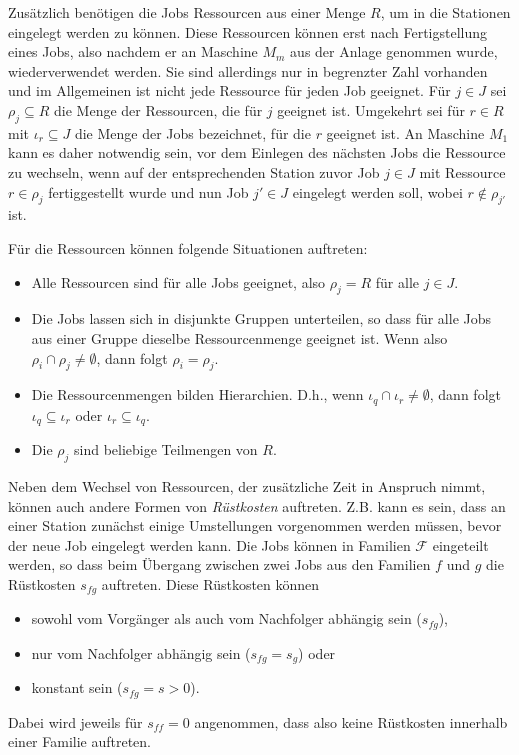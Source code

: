 \documentclass{scrreprt}
\begin{document}
Zusätzlich benötigen die Jobs Ressourcen aus einer Menge $R$, um in die Stationen eingelegt werden zu können. Diese Ressourcen können erst nach
Fertigstellung eines Jobs, also nachdem er an Maschine $M_m$ aus der Anlage genommen wurde, wiederverwendet werden.
Sie sind allerdings nur in begrenzter Zahl vorhanden und im Allgemeinen ist nicht jede Ressource für jeden Job geeignet.
Für $j\in J$ sei $\rho_j\subseteq R$ die Menge der Ressourcen, die für $j$ geeignet ist.
Umgekehrt sei für $r\in R$ mit $\iota_r\subseteq J$ die Menge der Jobs bezeichnet, für die $r$ geeignet ist.
An Maschine $M_1$ kann es daher notwendig sein, vor dem Einlegen des nächsten Jobs die Ressource zu wechseln, 
wenn auf der entsprechenden Station zuvor Job $j\in J$ mit Ressource $r\in\rho_j$ fertiggestellt wurde 
und nun Job $j'\in J$ eingelegt werden soll, wobei $r\not\in\rho_{j'}$ ist.

Für die Ressourcen können folgende Situationen auftreten:
\begin{itemize}
    \item Alle Ressourcen sind für alle Jobs geeignet, also $\rho_j=R$ für alle $j\in J$.
    \item Die Jobs lassen sich in disjunkte Gruppen unterteilen, so dass für alle Jobs aus einer Gruppe dieselbe Ressourcenmenge geeignet ist.
        Wenn also $\rho_i \cap \rho_j \neq \emptyset$, dann folgt $\rho_i=\rho_j$.
    \item Die Ressourcenmengen bilden Hierarchien. 
        D.h., wenn $\iota_q \cap \iota_r \neq \emptyset$, dann folgt $\iota_q \subseteq \iota_r$ oder $\iota_r \subseteq \iota_q$.
    \item Die $\rho_j$ sind beliebige Teilmengen von $R$.
\end{itemize}%
Neben dem Wechsel von Ressourcen, der zusätzliche Zeit in Anspruch nimmt, können auch andere Formen von \textit{Rüstkosten}
auftreten. Z.B. kann es sein, dass an einer Station zunächst einige Umstellungen vorgenommen werden müssen, bevor der
neue Job eingelegt werden kann. Die Jobs können in Familien $\mathcal{F}$ eingeteilt werden, so dass beim Übergang
zwischen zwei Jobs aus den Familien $f$ und $g$ die Rüstkosten $s_{fg}$ auftreten.
Diese Rüstkosten können 
\begin{itemize}
    \item sowohl vom Vorgänger als auch vom Nachfolger abhängig sein ($s_{fg}$), 
    \item nur vom Nachfolger abhängig sein ($s_{fg} = s_{g}$) oder
    \item konstant sein ($s_{fg} = s > 0$).
\end{itemize}%
Dabei wird jeweils für $s_{ff} = 0$ angenommen, dass also keine Rüstkosten innerhalb einer Familie auftreten.
\end{document}
